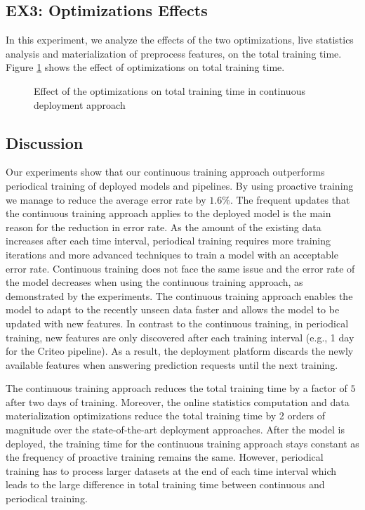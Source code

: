 \subsection{EX3: Optimizations Effects}
In this experiment, we analyze the effects of the two optimizations, live statistics analysis and materialization of preprocess features, on the total training time.
Figure \ref{optimization-effect} shows the effect of optimizations on total training time.
\begin{figure}[h!]
\centering
\resizebox{\columnwidth}{!}{}
\caption{Effect of the optimizations on total training time in continuous deployment approach}
\label{optimization-effect}
\end{figure}

\subsection{Discussion} \label{subsec:discussion}
Our experiments show that our continuous training approach outperforms periodical training of deployed models and pipelines.
By using proactive training we manage to reduce the average error rate by $1.6\%$.
The frequent updates that the continuous training approach applies to the deployed model is the main reason for the reduction in error rate.
As the amount of the existing data increases after each time interval, periodical training requires more training iterations and more advanced techniques to train a model with an acceptable error rate.
Continuous training does not face the same issue and the error rate of the model decreases when using the continuous training approach, as demonstrated by the experiments.
The continuous training approach enables the model to adapt to the recently unseen data faster and allows the model to be updated with new features.
In contrast to the continuous training, in periodical training, new features are only discovered after each training interval (e.g., 1 day for the Criteo pipeline).
As a result, the deployment platform discards the newly available features when answering prediction requests until the next training.

The continuous training approach reduces the total training time by a factor of $5$ after two days of training.
Moreover, the online statistics computation and data materialization optimizations reduce the total training time by 2 orders of magnitude over the state-of-the-art deployment approaches.
After the model is deployed, the training time for the continuous training approach stays constant as the frequency of proactive training remains the same.
However, periodical training has to process larger datasets at the end of each time interval which leads to the large difference in total training time between continuous and periodical training.


